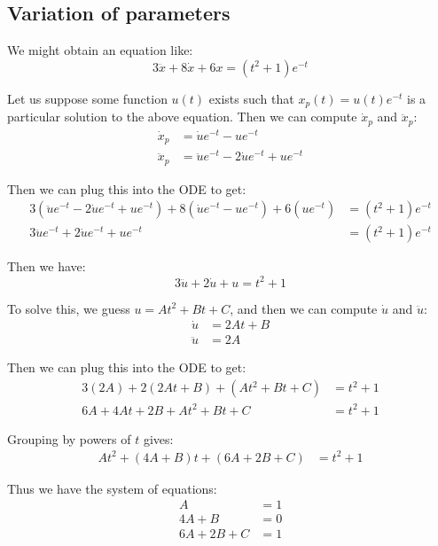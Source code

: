 \subsection{Variation of parameters}

We might obtain an equation like:
\begin{equation*}
3 \ddot x + 8 \dot x + 6x = (t^2 + 1) e^{-t}
\end{equation*}

Let us suppose some function $u(t)$ exists such that $x_p(t) = u(t) e^{-t}$ is a particular solution to the above equation. Then we can compute $\dot x_p$ and $\ddot x_p$:
\begin{align*}
\dot x_p &= \dot u e^{-t} - u e^{-t} \\
\ddot x_p &= \ddot u e^{-t} - 2 \dot u e^{-t} + u e^{-t}
\end{align*}

Then we can plug this into the ODE to get:
\begin{align*}
3 (\ddot u e^{-t} - 2 \dot u e^{-t} + u e^{-t}) + 8 (\dot u e^{-t} - u e^{-t}) + 6 (u e^{-t}) &= (t^2 + 1) e^{-t} \\
3 \ddot u e^{-t} + 2 \dot u e^{-t} + u e^{-t} &= (t^2 + 1) e^{-t}
\end{align*}

Then we have:
\begin{equation*}
3\ddot u + 2 \dot u + u = t^2 + 1
\end{equation*}

To solve this, we guess $u = At^2 + Bt + C$, and then we can compute $\dot u$ and $\ddot u$:
\begin{align*}
\dot u &= 2At + B \\
\ddot u &= 2A
\end{align*}

Then we can plug this into the ODE to get:
\begin{align*}
3(2A) + 2(2At + B) + (At^2 + Bt + C) &= t^2 + 1 \\
6A + 4At + 2B + At^2 + Bt + C &= t^2 + 1
\end{align*}

Grouping by powers of $t$ gives:
\begin{align*}
At^2 + (4A + B) t + (6A + 2B + C) &= t^2 + 1
\end{align*}

Thus we have the system of equations:
\begin{align*}
A &= 1 \\
4A + B &= 0 \\
6A + 2B + C &= 1
\end{align*}

